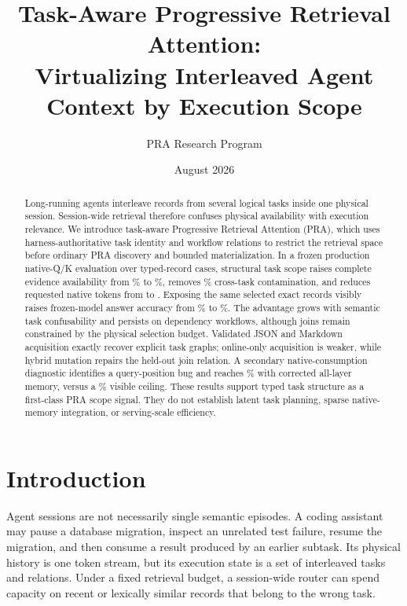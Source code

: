 \documentclass[10pt]{article}
\title{Task-Aware Progressive Retrieval Attention:\\Virtualizing Interleaved Agent Context by Execution Scope}
\author{PRA Research Program}
\date{August 2026}
\begin{document}
\maketitle

\begin{abstract}
Long-running agents interleave records from several logical tasks inside one physical session. Session-wide retrieval therefore confuses physical availability with execution relevance. We introduce task-aware Progressive Retrieval Attention (PRA), which uses harness-authoritative task identity and workflow relations to restrict the retrieval space before ordinary PRA discovery and bounded materialization. In a frozen production native-Q/K evaluation over \ProductionCases{} typed-record cases, structural task scope raises complete evidence availability from \ProductionSessionEvidence\% to \ProductionStructuralEvidence\%, removes \ProductionSessionContamination\% cross-task contamination, and reduces requested native tokens from \ProductionSessionNativeTokens{} to \ProductionStructuralNativeTokens{}. Exposing the same selected exact records visibly raises frozen-model answer accuracy from \ProductionVisibleSessionAccuracy\% to \ProductionVisibleStructuralAccuracy\%. The advantage grows with semantic task confusability and persists on dependency workflows, although joins remain constrained by the physical selection budget. Validated JSON and Markdown acquisition exactly recover explicit task graphs; online-only acquisition is weaker, while hybrid mutation repairs the held-out join relation. A secondary native-consumption diagnostic identifies a query-position bug and reaches \NativeBugNativeTaskAccuracy\% with corrected all-layer memory, versus a \NativeBugVisibleTaskAccuracy\% visible ceiling. These results support typed task structure as a first-class PRA scope signal. They do not establish latent task planning, sparse native-memory integration, or serving-scale efficiency.
\end{abstract}

\begin{center}
\end{center}

\section{Introduction}
Agent sessions are not necessarily single semantic episodes. A coding assistant may pause a database migration, inspect an unrelated test failure, resume the migration, and then consume a result produced by an earlier subtask. Its physical history is one token stream, but its execution state is a set of interleaved tasks and relations. Under a fixed retrieval budget, a session-wide router can spend capacity on recent or lexically similar records that belong to the wrong task.
\end{document}
